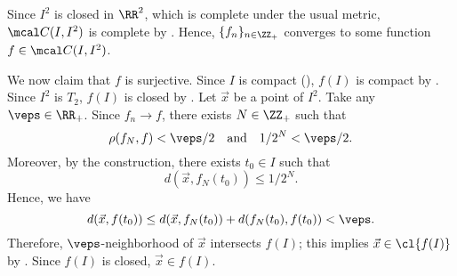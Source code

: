 \documentclass[MAS331_Note.tex]{subfiles}
\begin{document}
{    Since $I^2$ is closed in $\RR^2$, which is complete under the usual metric,
    $\mcal C(I, I^2)$ is complete by .
    Hence, $\{f_n\}_{n \in \ZZ_+}$ converges
    to some function $f \in \mcal C(I, I^2)$.

    We now claim that $f$ is surjective.
    Since $I$ is compact (), $f(I)$ is compact by
    . Since $I^2$ is $T_2$, $f(I)$ is closed
    by . 
    Let $\vec x$ be a point of $I^2$. Take any $\veps \in \RR_+$.
    Since $f_n \to f$, there exists $N \in \ZZ_+$ such that
    \[
        \rho(f_N, f) < \veps/2 \quad\text{and}\quad 1/2^N < \veps/2\text{.}
    \]
    Moreover, by the construction, there exists $t_0 \in I$ such that
    \[
        d(\vec x, f_N(t_0)) \le 1/2^N\text{.}
    \]
    Hence, we have
    \[
        d(\vec x, f(t_0)) \le d(\vec x, f_N(t_0)) + d(f_N(t_0), f(t_0))
        < \veps\text{.}
    \]
    Therefore, $\veps$-neighborhood of $\vec x$ intersects $f(I)$;
    this implies $\vec x \in \cl{f(I)}$ by .
    Since $f(I)$ is closed, $\vec x \in f(I)$.
}
\end{document}
